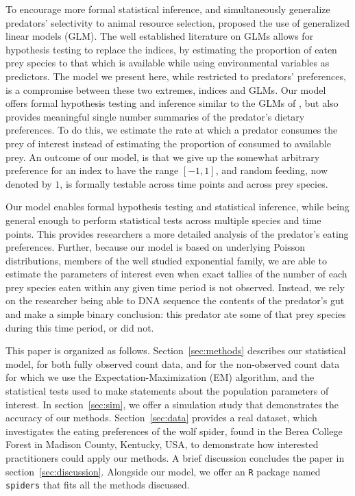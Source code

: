 To encourage more formal statistical inference, and simultaneously generalize predators' selectivity to animal resource selection, \citet{Manly:1992} proposed the use of generalized linear models (GLM).  The well established literature on GLMs allows for hypothesis testing to replace the indices, by estimating the proportion of eaten prey species to that which is available while using environmental variables as predictors.  The model we present here, while restricted to predators' preferences, is a compromise between these two extremes, indices and GLMs.  Our model offers formal hypothesis testing and inference similar to the GLMs of \citet{Manly:1992}, but also provides meaningful single number summaries of the predator's dietary preferences.  To do this, we estimate the rate at which a predator consumes the prey of interest instead of estimating the proportion of consumed to available prey.  An outcome of our model, is that we give up the somewhat arbitrary preference for an index to have the range $[-1,1]$, and random feeding, now denoted by $1$, is formally testable across time points and across prey species.

Our model enables formal hypothesis testing and statistical inference, while being general enough to perform statistical tests across multiple species and time points.  This provides researchers a more detailed analysis of the predator's eating preferences.  Further, because our model is based on underlying Poisson distributions, members of the well studied exponential family, we are able to estimate the parameters of interest even when exact tallies of the number of each prey species eaten within any given time period is not observed.  Instead, we rely on the researcher being able to DNA sequence the contents of the predator's gut and make a simple binary conclusion: this predator ate some of that prey species during this time period, or did not.  

This paper is organized as follows.  Section~\ref{sec:methods} describes our statistical model, for both fully observed count data, and for the non-observed count data for which we use the Expectation-Maximization (EM) algorithm, and the statistical tests used to make statements about the population parameters of interest.  In section~\ref{sec:sim}, we offer a simulation study that demonstrates the accuracy of our methods.  Section~\ref{sec:data} provides a real dataset, which investigates the eating preferences of the wolf spider, found in the Berea College Forest in Madison County, Kentucky, USA, to demonstrate how interested practitioners could apply our methods.  A brief discussion concludes the paper in section~\ref{sec:discussion}.  Alongside our model, we offer an \texttt{R} \citep{Core-Team:2014} package named \texttt{spiders} that fits all the methods discussed.  


